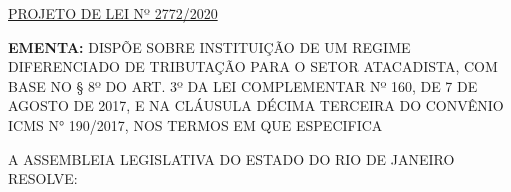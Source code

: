 \documentclass[10pt]{article}
\date{}
\begin{document}
\maketitle
\begin{center}
  \huge
  \vspace{-3cm}\href{http://alerjln1.alerj.rj.gov.br/scpro1923.nsf/f4b46b3cdbba990083256cc900746cf6/2faf228451d0fdbf0325858b005252b7?OpenDocument}{PROJETO DE LEI Nº 2772/2020}
\bigskip
\bigskip
\bigskip
  
\end{center}

\textbf{EMENTA:} 
DISPÕE SOBRE INSTITUIÇÃO DE UM REGIME DIFERENCIADO DE TRIBUTAÇÃO PARA O SETOR ATACADISTA, COM BASE NO § 8º DO ART. 3º DA LEI COMPLEMENTAR Nº 160, DE 7 DE AGOSTO DE 2017, E NA CLÁUSULA DÉCIMA TERCEIRA DO CONVÊNIO ICMS N° 190/2017, NOS TERMOS EM QUE ESPECIFICA








\bigskip

\noindent
A ASSEMBLEIA LEGISLATIVA DO ESTADO DO RIO DE JANEIRO RESOLVE:
\end{document}
